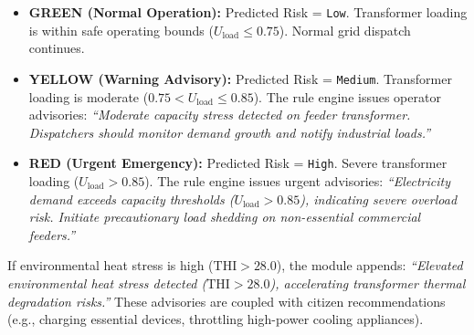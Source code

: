 \begin{itemize}
    \item \textbf{GREEN (Normal Operation):} Predicted Risk = \texttt{Low}. Transformer loading is within safe operating bounds ($U_{\text{load}} \le 0.75$). Normal grid dispatch continues.
    \item \textbf{YELLOW (Warning Advisory):} Predicted Risk = \texttt{Medium}. Transformer loading is moderate ($0.75 < U_{\text{load}} \le 0.85$). The rule engine issues operator advisories: \textit{``Moderate capacity stress detected on feeder transformer. Dispatchers should monitor demand growth and notify industrial loads.''}
    \item \textbf{RED (Urgent Emergency):} Predicted Risk = \texttt{High}. Severe transformer loading ($U_{\text{load}} > 0.85$). The rule engine issues urgent advisories: \textit{``Electricity demand exceeds capacity thresholds ($U_{\text{load}} > 0.85$), indicating severe overload risk. Initiate precautionary load shedding on non-essential commercial feeders.''}
\end{itemize}

If environmental heat stress is high ($\text{THI} > 28.0$), the module appends: \textit{``Elevated environmental heat stress detected ($\text{THI} > 28.0$), accelerating transformer thermal degradation risks.''} These advisories are coupled with citizen recommendations (e.g., charging essential devices, throttling high-power cooling appliances).

